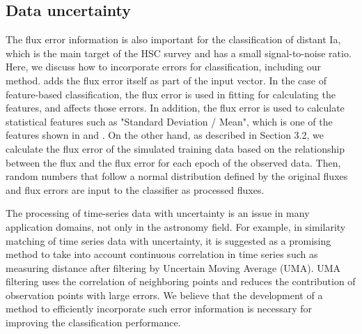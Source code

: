 \documentclass[useamsfonts]{pasj01}
\begin{document}
\subsection{Data uncertainty}
%
The flux error information is also important for the classification of distant Ia, which is the main target of the HSC survey and has a small signal-to-noise ratio.
Here, we discuss how to incorporate errors for classification, including our method.
\citet{charnock17a} adds the flux error itself as part of the input vector.
In the case of feature-based classification, the flux error is used in fitting for calculating the features, and affects those errors.
In addition, the flux error is used to calculate statistical features such as "Standard Deviation / Mean", which is one of the features shown in \citet{narayan18a} and \citet{Muthukrishna_2019}.
On the other hand, as described in Section 3.2, we calculate the flux error of the simulated training data based on the relationship between the flux and the flux error for each epoch of the observed data.
Then, random numbers that follow a normal distribution defined by the original fluxes and flux errors are input to the classifier as processed fluxes.

The processing of time-series data with uncertainty is an issue in many application domains, not only in the astronomy field.
For example, in similarity matching of time series data with uncertainty, it is suggested as a promising method to take into account continuous correlation in time series such as measuring distance after filtering by Uncertain Moving Average (UMA)\citep{Dallachiesa_2012}.
UMA filtering uses the correlation of neighboring points and reduces the contribution of observation points with large errors.
We believe that the development of a method to efficiently incorporate such error information is necessary for improving the classification performance.
%
\end{document}

